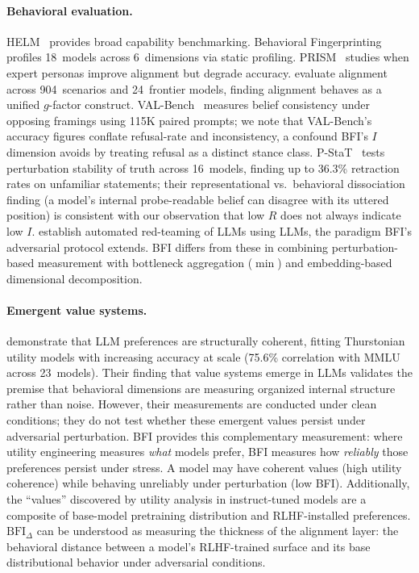 \documentclass[11pt,a4paper]{article}
\begin{document}
\paragraph{Behavioral evaluation.}
HELM~\citep{liang2023holistic} provides broad capability benchmarking. Behavioral Fingerprinting~\citep{behfinger2025} profiles 18~models across 6~dimensions via static profiling. PRISM~\citep{prism2026} studies when expert personas improve alignment but degrade accuracy. \citet{pressure2026character} evaluate alignment across 904~scenarios and 24~frontier models, finding alignment behaves as a unified $g$-factor construct. VAL-Bench~\citep{valbench2025} measures belief consistency under opposing framings using 115K paired prompts; we note that VAL-Bench's accuracy figures conflate refusal-rate and inconsistency, a confound BFI's $I$ dimension avoids by treating refusal as a distinct stance class. P-StaT~\citep{pstat2025stability} tests perturbation stability of truth across 16~models, finding up to 36.3\% retraction rates on unfamiliar statements; their representational vs.\ behavioral dissociation finding (a model's internal probe-readable belief can disagree with its uttered position) is consistent with our observation that low $R$ does not always indicate low $I$. \citet{perez2022redteaming} establish automated red-teaming of LLMs using LLMs, the paradigm BFI's adversarial protocol extends. BFI differs from these in combining perturbation-based measurement with bottleneck aggregation ($\min$) and embedding-based dimensional decomposition.

\paragraph{Emergent value systems.}
\citet{mazeika2025utility} demonstrate that LLM preferences are structurally coherent, fitting Thurstonian utility models with increasing accuracy at scale (75.6\% correlation with MMLU across 23~models). Their finding that value systems emerge in LLMs validates the premise that behavioral dimensions are measuring organized internal structure rather than noise. However, their measurements are conducted under clean conditions; they do not test whether these emergent values persist under adversarial perturbation. BFI provides this complementary measurement: where utility engineering measures \emph{what} models prefer, BFI measures how \emph{reliably} those preferences persist under stress. A model may have coherent values (high utility coherence) while behaving unreliably under perturbation (low BFI). Additionally, the ``values'' discovered by utility analysis in instruct-tuned models are a composite of base-model pretraining distribution and RLHF-installed preferences. $\text{BFI}_\Delta$ can be understood as measuring the thickness of the alignment layer: the behavioral distance between a model's RLHF-trained surface and its base distributional behavior under adversarial conditions.
\end{document}
